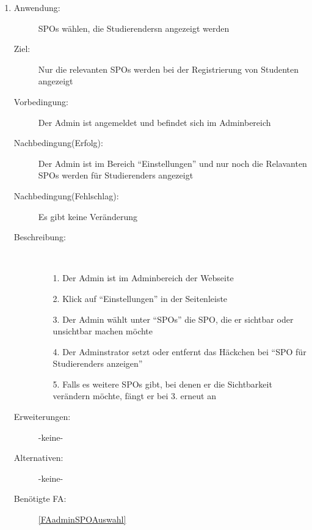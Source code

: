 \documentclass[parskip=full]{scrartcl}
\newcommand{\swtLabel}[1]{\textbf{/#1\arabic*0/}}
\begin{document}
\begin{enumerate} [label=\swtLabel{A}]
  \item \label{UCadminSPOwelcheWerdeAngezeigt}
    \begin{description}
    \item[Anwendung:] \glspl{SPO} wählen, die \glspl{Studierender}n angezeigt werden
    \item[Ziel:] Nur die relevanten \glspl{SPO} werden bei der Registrierung von
    Studenten angezeigt
    \item[Vorbedingung:] Der \gls{Admin} ist angemeldet und befindet sich im \gls{Admin}bereich
    \item[Nachbedingung(Erfolg):] Der \gls{Admin} ist im Bereich
    \enquote{Einstellungen} und nur noch die Relavanten \glspl{SPO} werden für
        \glspl{Studierender} angezeigt
    \item[Nachbedingung(Fehlschlag):] Es gibt keine Veränderung
    \item[Beschreibung:]~
    \begin{enumerate}
      \item[1.] Der \gls{Admin} ist im \gls{Admin}bereich der Webseite
      \item[2.] Klick auf \enquote{Einstellungen} in der Seitenleiste
      \item[3.] Der \gls{Admin} wählt unter \enquote{\glspl{SPO}} die \gls{SPO}, die er
      sichtbar oder unsichtbar machen möchte
      \item[4.] Der Adminstrator setzt oder entfernt das Häckchen bei
      \enquote{\gls{SPO} für \glspl{Studierender} anzeigen} %
      \item[5.] Falls es weitere \glspl{SPO} gibt, bei denen er die Sichtbarkeit
      verändern möchte, fängt er bei 3. erneut an  
    \end{enumerate}
    \item[Erweiterungen:] -keine-
    \item[Alternativen:] -keine-
    \item[Benötigte FA:] \ref{FAadminSPOAuswahl}
  \end{description}
  

\end{enumerate}
\end{document}
